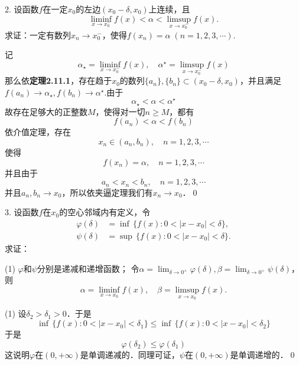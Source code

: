 2. 设函数$f$在一定$x_0$的左边$(x_0-\delta,x_0)$上连续，且
\begin{equation*}
    \liminf_{x \to x_0^-} f(x) < \alpha < \limsup_{x \to x_0^-} f(x).
\end{equation*}
求证：一定有数列$x_n \to x_0^-$，使得$f(x_n)=\alpha \; (n=1,2,3,\cdots)$.

\prove 记
\begin{equation}
    \alpha_\star = \liminf_{x \to x_0^-} f(x), \quad \alpha^\star = \limsup_{x \to x_0^-} f(x)
\end{equation}
那么依\textbf{定理2.11.1}，存在趋于$x_0$的数列$\{ a_n \}, \{ b_n \} \subset (x_0 - \delta, x_0)$，并且满足$f(a_n) \to \alpha_\star, f(b_n) \to \alpha^\star$.由于
\begin{equation}
    \alpha_\star < \alpha < \alpha^\star
\end{equation}
故存在足够大的正整数$M$，使得对一切$n \geq M$，都有
\begin{equation}
    f(a_n) < \alpha < f(b_n)
\end{equation}
依介值定理，存在
\begin{equation}
    x_n \in (a_n, b_n), \quad n = 1,2,3,\cdots
\end{equation}
使得
\begin{equation}
    f(x_n) = \alpha, \quad n = 1,2,3,\cdots
\end{equation}
并且由于
\begin{equation}
    a_n < x_n < b_n, \quad n = 1,2,3,\cdots
\end{equation}
并且$a_n, b_n \to x_0$，所以依夹逼定理我们有$x_n \to x_0$．\qed\bigskip

3. 设函数$f$在$x_0$的空心邻域内有定义，令
\begin{align*}
    \varphi\left(\delta\right) &= \inf \, \{ f(x) : 0 < \lvert x - x_0 \rvert < \delta \}, \\
    \psi\left(\delta\right) &= \sup \, \{ f(x) : 0 < \lvert x - x_0 \rvert < \delta \} .
\end{align*}
求证：
\begin{tasks}(1)
    \task $\varphi$和$\psi$分别是递减和递增函数；
    \task 令$\alpha = \displaystyle\lim_{\delta \to 0^+} \varphi (\delta), \beta = \displaystyle\lim_{\delta \to 0^+} \psi(\delta)$，则
    \begin{equation*}
        \alpha = \liminf_{x \to x_0} f(x), \quad \beta = \limsup_{x \to x_0} f(x).
    \end{equation*}
\end{tasks}

(1) \prove 设$\delta_2 > \delta_1 > 0$．于是
\begin{equation}
    \inf \, \{ f(x) : 0 < \lvert x - x_0 \rvert < \delta_1 \} \leq \inf \, \{ f(x) : 0 < \lvert x - x_0 \rvert < \delta_2 \}
\end{equation}
于是
\begin{equation*}
    \varphi (\delta_2) \leq \varphi (\delta_1)
\end{equation*}
这说明$\varphi$在$(0, +\infty)$是单调递减的．同理可证，$\psi$在$(0,+\infty)$是单调递增的．\qed\bigskip